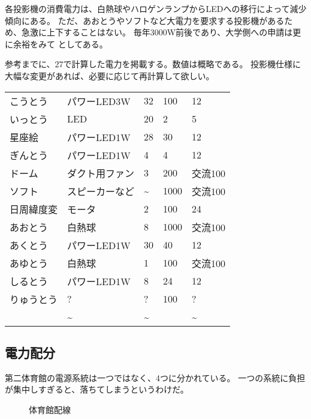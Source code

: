 \documentclass[letterpaper,10pt,dvipdfmx]{sphinxmanual}
\begin{document}
各投影機の消費電力は、白熱球やハロゲンランプからLEDへの移行によって減少傾向にある。
ただ、あおとうやソフトなど大電力を要求する投影機があるため、急激に上下することはない。
毎年3000W前後であり、大学側への申請は更に余裕をみて
としてある。

参考までに、27で計算した電力を掲載する。数値は概略である。
投影機仕様に大幅な変更があれば、必要に応じて再計算して欲しい。

\noindent\begin{tabulary}{\linewidth}{|L|L|L|L|L|}
\hline
{}\relax &\relax &\relax &\relax &\relax \\
\hline
こうとう
&
パワーLED3W
&
32
&
100
&
12
\\
\hline
いっとう
&
LED
&
20
&
2
&
5
\\
\hline
星座絵
&
パワーLED1W
&
28
&
30
&
12
\\
\hline
ぎんとう
&
パワーLED1W
&
4
&
4
&
12
\\
\hline
ドーム
&
ダクト用ファン
&
3
&
200
&
交流100
\\
\hline
ソフト
&
スピーカーなど
&
\textasciitilde{}
&
1000
&
交流100
\\
\hline
日周緯度変
&
モータ
&
2
&
100
&
24
\\
\hline
あおとう
&
白熱球
&
8
&
1000
&
交流100
\\
\hline
あくとう
&
パワーLED1W
&
30
&
40
&
12
\\
\hline
あゆとう
&
白熱球
&
1
&
100
&
交流100
\\
\hline
しるとう
&
パワーLED1W
&
8
&
24
&
12
\\
\hline
りゅうとう
&
?
&
?
&
100
&
?
\\
\hline
{}
&
\textasciitilde{}
&
\textasciitilde{}
&
&
\textasciitilde{}
\\
\hline\end{tabulary}



\subsection{電力配分}
\label{\detokenize{haisen:id6}}
第二体育館の電源系統は一つではなく、4つに分かれている。
一つの系統に負担が集中しすぎると、落ちてしまうというわけだ。
\begin{figure}[htbp]
\centering
\capstart

\noindent{}
\caption{体育館配線}\label{\detokenize{haisen:id19}}\end{figure}
\end{document}
